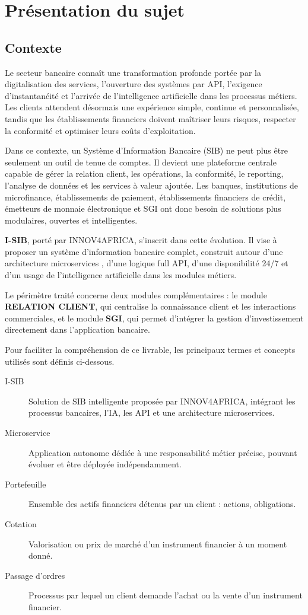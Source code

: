 \documentclass[a4paper,12pt]{report}
\begin{document}
\section{Présentation du sujet}

\subsection{Contexte}

Le secteur bancaire connaît une transformation profonde portée par la
digitalisation des services, l'ouverture des systèmes par API, l'exigence
d'instantanéité et l'arrivée de l'intelligence artificielle dans les processus
métiers. Les clients attendent désormais une expérience simple, continue et
personnalisée, tandis que les établissements financiers doivent maîtriser leurs
risques, respecter la conformité et optimiser leurs coûts d'exploitation.

Dans ce contexte, un Système d'Information Bancaire (SIB) ne peut plus être
seulement un outil de tenue de comptes. Il devient une plateforme centrale
capable de gérer la relation client, les opérations, la conformité, le
reporting, l'analyse de données et les services à valeur ajoutée. Les banques,
institutions de microfinance, établissements de paiement, établissements
financiers de crédit, émetteurs de monnaie électronique et SGI ont donc besoin
de solutions plus modulaires, ouvertes et intelligentes.

\textbf{I-SIB}, porté par INNOV4AFRICA, s'inscrit dans cette évolution. Il
vise à proposer un système d'information bancaire complet, construit autour
d'une architecture microservices \cite{fowler_microservices}, d'une logique full API, d'une disponibilité
24/7 et d'un usage de l'intelligence artificielle dans les modules métiers.

Le périmètre traité concerne deux modules complémentaires : le module
\textbf{RELATION CLIENT}, qui centralise la connaissance client et les
interactions commerciales, et le module \textbf{SGI}, qui permet d'intégrer la
gestion d'investissement directement dans l'application bancaire.

Pour faciliter la compréhension de ce livrable, les principaux termes et
concepts utilisés sont définis ci-dessous.

\begin{description}
  \item[I-SIB] Solution de SIB intelligente proposée par INNOV4AFRICA,
    intégrant les processus bancaires, l'IA, les API et une architecture
    microservices.
  \item[Microservice] Application autonome dédiée à une responsabilité métier
    précise, pouvant évoluer et être déployée indépendamment.
  \item[Portefeuille] Ensemble des actifs financiers détenus par un client :
    actions, obligations.
  \item[Cotation] Valorisation ou prix de marché d'un instrument financier
    à un moment donné.
  \item[Passage d'ordres] Processus par lequel un client demande l'achat
    ou la vente d'un instrument financier.
\end{description}
\newpage
\end{document}
